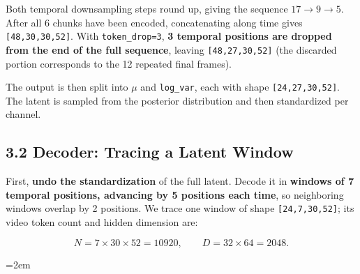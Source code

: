 \documentclass[
  11pt,
  a4paper,
]{article}
\newcommand{\NotesTableStyle}{\linespread{1}\fontsize{9.5pt}{13pt}\selectfont\setlength{\tabcolsep}{4pt}\renewcommand{\arraystretch}{1.1}\setlength{\extrarowheight}{5pt}\setlength{\LTpre}{5pt}\setlength{\LTpost}{6pt}\setlength{\parskip}{0pt}\emergencystretch=2em}
\begin{document}
Both temporal downsampling steps round up, giving the sequence
\textbf{\(17\rightarrow9\rightarrow5\)}. After all 6 chunks have been
encoded, concatenating along time gives \texttt{{[}48,30,30,52{]}}. With
\texttt{token\_drop=3}, \textbf{3 temporal positions are dropped from
the end of the full sequence}, leaving \texttt{{[}48,27,30,52{]}} (the
discarded portion corresponds to the 12 repeated final frames).

The output is then split into \(\mu\) and \texttt{log\_var}, each with
shape \texttt{{[}24,27,30,52{]}}. The latent is sampled from the
posterior distribution and then standardized per channel.


\subsection{3.2 Decoder: Tracing a Latent Window}\label{h3-decoder}

First, \textbf{undo the standardization} of the full latent. Decode it
in \textbf{windows of 7 temporal positions, advancing by 5 positions
each time}, so neighboring windows overlap by 2 positions. We trace one
window of shape \texttt{{[}24,7,30,52{]}}; its video token count and
hidden dimension are:

\[
N=7\times30\times52=10920,\qquad D=32\times64=2048.
\]

\begingroup\NotesTableStyle\fontsize{10pt}{12pt}\selectfont\renewcommand{\arraystretch}{1.02}\setlength{\extrarowheight}{1pt}
\end{document}
